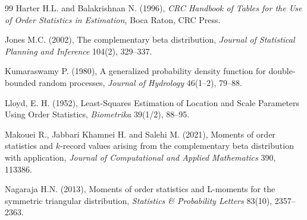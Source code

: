 \documentclass[twoside]{article}
\begin{document}
\begin{thebibliography}{99}
Harter H.L. and Balakrishnan N. (1996), {\it CRC Handbook of Tables for the Use of Order Statistics in Estimation,} Boca Raton, CRC Press.

Jones M.C. (2002), The complementary beta distribution, {\it Journal of Statistical Planning and Inference} 104(2), 329--337.

Kumaraswamy P. (1980), A generalized probability density function for double-bounded random processes, {\it Journal of Hydrology} 46(1--2), 79--88.

Lloyd, E. H. (1952), Least-Squares Estimation of Location and Scale Parameters Using Order Statistics, {\it Biometrika} 39(1/2), 88--95.

Makouei R., Jabbari Khamnei H. and Salehi M. (2021), Moments of order statistics and $k$-record values arising from the complementary beta distribution with application, {\it Journal of Computational and Applied Mathematics} 390, 113386.

Nagaraja H.N. (2013), Moments of order statistics and L-moments for the symmetric triangular distribution, {\it Statistics \& Probability Letters} 83(10), 2357--2363.

\end{thebibliography}
\end{document}
